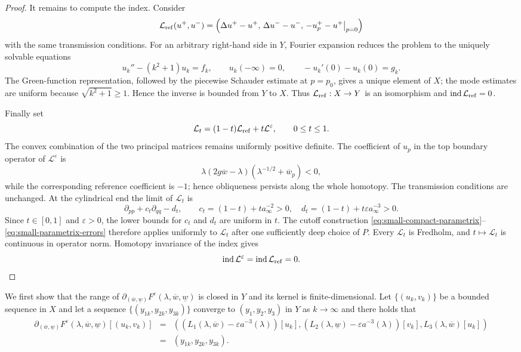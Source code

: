 \documentclass[11pt,reqno]{amsart}
\numberwithin{equation}{section}
\theoremstyle{definition}
\theoremstyle{remark}
\begin{document}
\begin{proof}
It remains to compute the index.  Consider
\[
\mathcal L_{\rm ref}(u^+,u^-)
=
\left(
\Delta u^+-u^+,\,
\Delta u^--u^-,\,
-u_p^+-u^+\big|_{p=0}
\right)
\]
with the same transmission conditions.  For an arbitrary right-hand
side in $Y$, Fourier expansion reduces the problem to the uniquely
solvable equations
\[
 u_k''-(k^2+1)u_k=f_k,
 \qquad u_k(-\infty)=0,
 \qquad -u_k'(0)-u_k(0)=g_k.
\]
The Green-function representation, followed by the piecewise
Schauder estimate at $p=p_0$, gives a unique element of $X$; the
mode estimates are uniform because $\sqrt{k^2+1}\geq1$.  Hence the
inverse is bounded from $Y$ to $X$.  Thus
$\mathcal L_{\rm ref}:X\to Y$ is an isomorphism and
$\operatorname{ind}\mathcal L_{\rm ref}=0$.

Finally set
\[
 \mathcal L_t=(1-t)\mathcal L_{\rm ref}
 +t\mathcal L^\varepsilon,
 \qquad 0\leq t\leq1.
\]
The convex combination of the two principal matrices remains
uniformly positive definite.  The coefficient of $u_p$ in the top
boundary operator of $\mathcal L^\varepsilon$ is
\[
 \lambda(2g\overline w-\lambda)
   (\lambda^{-1/2}+\overline w_p)<0,
\]
while the corresponding reference coefficient is $-1$; hence
obliqueness persists along the whole homotopy.  The transmission
conditions are unchanged.  At the cylindrical end the limit of
$\mathcal L_t$ is
\[
 \partial_{pp}+c_t\partial_{qq}-d_t,
 \qquad
 c_t=(1-t)+ta_\infty^{-2}>0,
 \quad
 d_t=(1-t)+t\varepsilon a_\infty^{-3}>0.
\]
Since $t\in[0,1]$ and $\varepsilon>0$, the lower bounds for $c_t$ and
$d_t$ are uniform in $t$.  The cutoff construction
\eqref{eq:small-compact-parametrix}--
\eqref{eq:small-parametrix-errors} therefore applies uniformly to
$\mathcal L_t$ after one sufficiently deep choice of $P$.  Every
$\mathcal L_t$ is Fredholm, and $t\mapsto\mathcal L_t$ is continuous
in operator norm.  Homotopy invariance of the index gives
\[
 \operatorname{ind}\mathcal L^\varepsilon
 =\operatorname{ind}\mathcal L_{\rm ref}=0.
\]
\end{proof}
\iffalse
We first show that the range of
$\partial_{(\overline{w},\underline{w})}F^{\varepsilon}(\lambda,
\overline{w},\underline{w})$ is closed in $Y$ and its kernel is
finite-dimensional. Let $\{(u_k,v_k)\}$ be a bounded sequence in $X$
and let a sequence $\{(y_{1k},y_{2k},y_{3k})\}$ converge to
$(y_1,y_2,y_3)$ in $Y$ as $k\rightarrow \infty$ and there holds that
\begin{eqnarray}
\partial_{(\overline{w},\underline{w})}F^{\varepsilon}(\lambda, \overline{w},\underline{w})[(u_k,v_k)]&=&\left((L_1(\lambda,\overline{w})-\varepsilon a^{-3}(\lambda))[u_k], (L_2(\lambda,\underline{w})-\varepsilon a^{-3}(\lambda))[v_k], L_3(\lambda,\overline{w})[u_k]\right) \nonumber\\
&=&(y_{1k},y_{2k},y_{3k}). \nonumber
\end{eqnarray}
\end{document}
